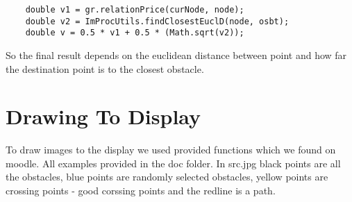 \documentclass[12pt]{article}
\begin{document}
\begin{lstlisting}
    double v1 = gr.relationPrice(curNode, node);
    double v2 = ImProcUtils.findClosestEuclD(node, osbt);
    double v = 0.5 * v1 + 0.5 * (Math.sqrt(v2));
\end{lstlisting}

So the final result depends on the euclidean distance between point and how far the destination point is to the closest obstacle.

\section{Drawing To Display}

To draw images to the display we used provided functions which we found on moodle. All examples provided in the doc folder. In src.jpg black points are all the obstacles, blue points are randomly selected obstacles, yellow points are crossing points - good corssing points and the redline is a path.



\end{document}
